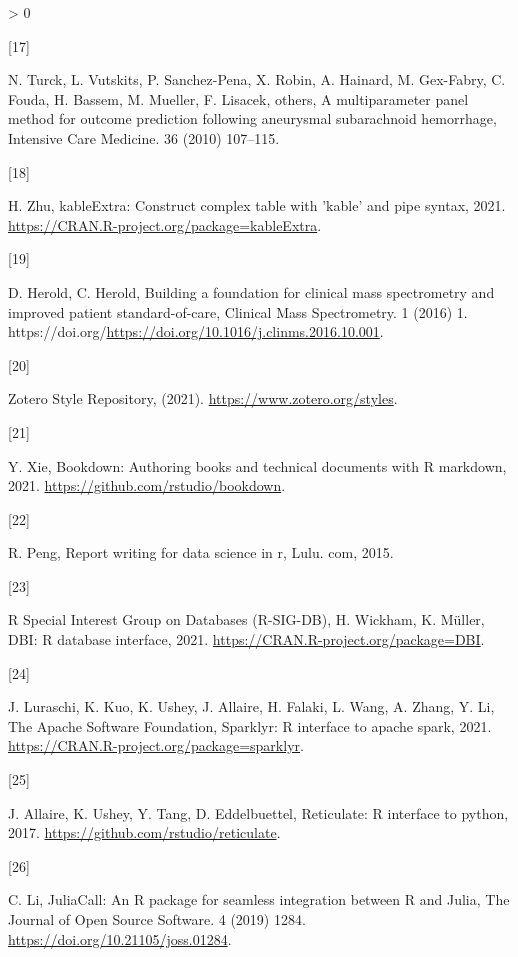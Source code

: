 \documentclass[]{elsarticle} %
\newlength{\csllabelwidth}
\newlength{\cslhangindent}
\newenvironment{CSLReferences}[3] %
 {%
  \setlength{\parindent}{0pt}
  \ifodd #1 \everypar{\setlength{\hangindent}{\cslhangindent}}\ignorespaces\fi
  \ifnum #2 > 0
  \setlength{\parskip}{#2\baselineskip}
  \fi
 }%
 {}
\newcommand{\CSLLeftMargin}[1]{\parbox[t]{\csllabelwidth}{#1}}
\newcommand{\CSLRightInline}[1]{\parbox[t]{\linewidth - \csllabelwidth}{#1}}
\begin{document}
\begin{CSLReferences}{0}{0}
\leavevmode\hypertarget{ref-turck2010multiparameter}{}%
\CSLLeftMargin{{[}17{]} }
\CSLRightInline{N. Turck, L. Vutskits, P. Sanchez-Pena, X. Robin, A.
Hainard, M. Gex-Fabry, C. Fouda, H. Bassem, M. Mueller, F. Lisacek,
others, A multiparameter panel method for outcome prediction following
aneurysmal subarachnoid hemorrhage, Intensive Care Medicine. 36 (2010)
107--115.}

\leavevmode\hypertarget{ref-2021kableextra}{}%
\CSLLeftMargin{{[}18{]} }
\CSLRightInline{H. Zhu, kableExtra: Construct complex table with 'kable'
and pipe syntax, 2021.
\url{https://CRAN.R-project.org/package=kableExtra}.}

\leavevmode\hypertarget{ref-Herold2016}{}%
\CSLLeftMargin{{[}19{]} }
\CSLRightInline{D. Herold, C. Herold, Building a foundation for clinical
mass spectrometry and improved patient standard-of-care, Clinical Mass
Spectrometry. 1 (2016) 1.
https://doi.org/\url{https://doi.org/10.1016/j.clinms.2016.10.001}.}

\leavevmode\hypertarget{ref-Zoterostyles}{}%
\CSLLeftMargin{{[}20{]} }
\CSLRightInline{{Zotero Style Repository}, (2021).
\url{https://www.zotero.org/styles}.}

\leavevmode\hypertarget{ref-xie2021bookdown}{}%
\CSLLeftMargin{{[}21{]} }
\CSLRightInline{Y. Xie, Bookdown: Authoring books and technical
documents with {R} markdown, 2021.
\url{https://github.com/rstudio/bookdown}.}

\leavevmode\hypertarget{ref-peng2015report}{}%
\CSLLeftMargin{{[}22{]} }
\CSLRightInline{R. Peng, Report writing for data science in r, Lulu.
com, 2015.}

\leavevmode\hypertarget{ref-DBI}{}%
\CSLLeftMargin{{[}23{]} }
\CSLRightInline{R Special Interest Group on Databases (R-SIG-DB), H.
Wickham, K. Müller, DBI: R database interface, 2021.
\url{https://CRAN.R-project.org/package=DBI}.}

\leavevmode\hypertarget{ref-sparklyr}{}%
\CSLLeftMargin{{[}24{]} }
\CSLRightInline{J. Luraschi, K. Kuo, K. Ushey, J. Allaire, H. Falaki, L.
Wang, A. Zhang, Y. Li, The Apache Software Foundation, Sparklyr: R
interface to apache spark, 2021.
\url{https://CRAN.R-project.org/package=sparklyr}.}

\leavevmode\hypertarget{ref-Reticulate}{}%
\CSLLeftMargin{{[}25{]} }
\CSLRightInline{J. Allaire, K. Ushey, Y. Tang, D. Eddelbuettel,
Reticulate: R interface to python, 2017.
\url{https://github.com/rstudio/reticulate}.}

\leavevmode\hypertarget{ref-JuliaCall}{}%
\CSLLeftMargin{{[}26{]} }
\CSLRightInline{C. Li, {JuliaCall}: An {R} package for seamless
integration between {R} and {Julia}, The Journal of Open Source
Software. 4 (2019) 1284. \url{https://doi.org/10.21105/joss.01284}.}


\end{CSLReferences}
\end{document}
